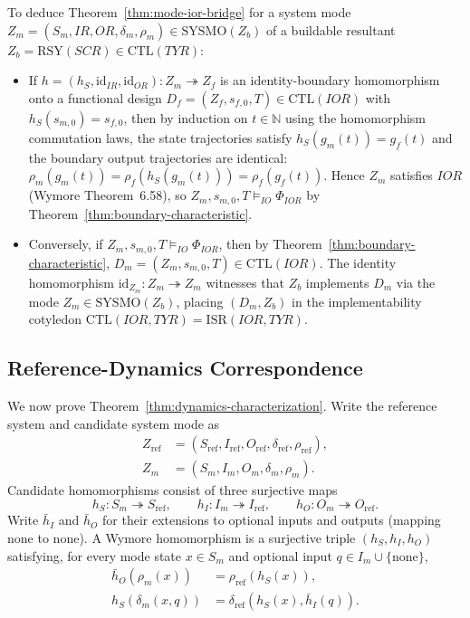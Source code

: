 To deduce Theorem~\ref{thm:mode-ior-bridge} for a system mode $Z_m=(S_m,IR,OR,\delta_m,\rho_m)\in\mathrm{SYSMO}(Z_b)$ of a buildable resultant $Z_b=\mathrm{RSY}(SCR)\in\mathrm{CTL}(TYR)$:
\begin{itemize}
    \item If $h=(h_S,\mathrm{id}_{IR},\mathrm{id}_{OR}):Z_m\twoheadrightarrow Z_f$ is an identity-boundary homomorphism onto a functional design $D_f=(Z_f,s_{f,0},T)\in\mathrm{CTL}(IOR)$ with $h_S(s_{m,0})=s_{f,0}$, then by induction on $t\in\mathbb{N}$ using the homomorphism commutation laws, the state trajectories satisfy $h_S(g_m(t))=g_f(t)$ and the boundary output trajectories are identical: $\rho_m(g_m(t))=\rho_f(h_S(g_m(t)))=\rho_f(g_f(t))$. Hence $Z_m$ satisfies $IOR$ (Wymore Theorem~6.58), so $Z_m,s_{m,0},T\models_{IO}\Phi_{IOR}$ by Theorem~\ref{thm:boundary-characteristic}.
    \item Conversely, if $Z_m,s_{m,0},T\models_{IO}\Phi_{IOR}$, then by Theorem~\ref{thm:boundary-characteristic}, $D_m=(Z_m,s_{m,0},T)\in\mathrm{CTL}(IOR)$. The identity homomorphism $\mathrm{id}_{Z_m}:Z_m\twoheadrightarrow Z_m$ witnesses that $Z_b$ implements $D_m$ via the mode $Z_m\in\mathrm{SYSMO}(Z_b)$, placing $(D_m,Z_b)$ in the implementability cotyledon $\mathrm{CTL}(IOR,TYR)=\mathrm{ISR}(IOR,TYR)$.
\end{itemize}

\subsection{Reference-Dynamics Correspondence}
\label{app:hom-setup}

We now prove Theorem~\ref{thm:dynamics-characterization}. Write the reference system and candidate system mode as
\begin{align*}
Z_{\mathrm{ref}}
  &= (S_{\mathrm{ref}},I_{\mathrm{ref}},O_{\mathrm{ref}},
      \delta_{\mathrm{ref}},\rho_{\mathrm{ref}}),\\
Z_m
  &= (S_m,I_m,O_m,
      \delta_m,\rho_m).
\end{align*}
Candidate homomorphisms consist of three surjective maps
\[
 h_S:S_m\twoheadrightarrow S_{\mathrm{ref}},\qquad
 h_I:I_m\twoheadrightarrow I_{\mathrm{ref}},\qquad
 h_O:O_m\twoheadrightarrow O_{\mathrm{ref}}.
\]
Write $\bar h_I$ and $\bar h_O$ for their extensions to optional inputs and outputs (mapping $\mathrm{none}$ to $\mathrm{none}$). A Wymore homomorphism is a surjective triple $(h_S,h_I,h_O)$ satisfying, for every mode state $x\in S_m$ and optional input $q\in I_m\cup\{\mathrm{none}\}$,
\begin{align}
  \bar h_O\!\left(\rho_m(x)\right)
    &= \rho_{\mathrm{ref}}\!\left(h_S(x)\right),
    \label{eq:hom-readout-static}\\
  h_S\!\left(\delta_m(x,q)\right)
    &= \delta_{\mathrm{ref}}\!\left(h_S(x),\bar h_I(q)\right).
    \label{eq:hom-step-static}
\end{align}

